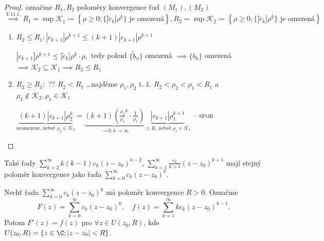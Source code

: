 \begin{proof}
  označme $R_1, R_2$ poloměry konvergence řad $(M_1), (M_2)$
  $\stackrel{V. 11. 1.}{\implies} R_1 = \sup \mathscr K_1 \coloneq \left\{\rho \geq 0; \{|\tilde{c}_k|\rho^k\} \text{ je omezená}\right\}, R_2 = \sup \mathscr K_2 \coloneq \left\{\rho \geq 0; \{|\tilde{c}_k|\rho^k\} \text{ je omezená}\right\}$
  \begin{enumerate}[{ad} ]
    \item $\underline{R_2 \leq R_1}: |c_{k+1}|\rho^{k+1} \leq (k+1)|c_{k+1}|\rho^{k+1}$

    $|c_{k+1}|\rho^{k+1} \leq |\tilde{c}_k|\rho^k \cdot \rho,$ tedy pokud $\{\tilde{b}_n\}$ omezená $\implies \{b_k\}$ omezená $\implies \mathscr K_2 \subseteq \mathscr K_1 \implies R_2 \leq R_1$
    \item $\underline{R_2 \geq R_1}:$ ?? $R_2 < R_1$ \dots najděme $\rho_1, \rho_2$ t. ž. $R_2 < \rho_2<\rho_1<R_1$ a $ \rho_2 \notin \mathscr K_2, \rho_1 \in \mathscr K_1$

    $\underbrace{(k+1)|c_{k+1}|\rho_2^k}_{\text{neomezené, neboť } \rho_2 \in \mathscr K_2}=\underbrace{(k+1)\left(\frac{\rho_2}{\rho_1}^k\cdot \frac{1}{\rho_1}\right)}_{\to 0, k \to \infty}\underbrace{|c_{k+1}|\rho_1^{k+1}}_{\leq K\text{, neboť } \rho_1 \in \mathscr K_1}$ -- \textsc{spor} \Lightning
  \end{enumerate}
\end{proof}

\begin{dusledek}
Také řady $\sum_{k=2}^{\infty}k(k-1)c_k(z - z_0)^{k-2}$, $\sum_{k=1}^{\infty}\frac{c_k}{k+1}(z - z_0)^{k+1}$ mají stejný poloměr konvergence jako řada $\sum_{k=0}^{\infty}c_k(z - z_0)^k$.
\end{dusledek}

\begin{veta}
Nechť řada $\sum_{k=0}^{\infty}c_k(z - z_0)^k$ má poloměr konvergence $R > 0$. Označme
\[
F(z) = \sum_{k=0}^{\infty} c_k (z - z_0)^k, \quad f(z) = \sum_{k=1}^{\infty} k c_k (z - z_0)^{k-1}.
\]
Potom $F'(z) = f(z)$ pro $\forall z \in U(z_0, R)$, kde $U(z_0, R) = \{z \in \C; |z - z_0| < R\}$.
\end{veta}

